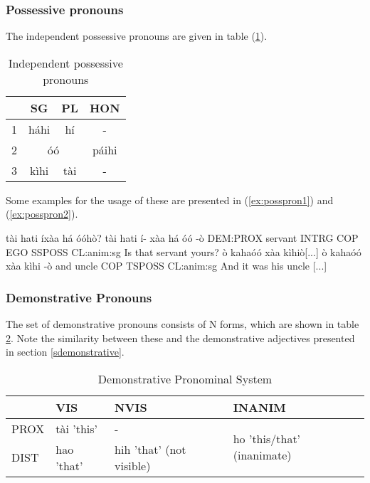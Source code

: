 \documentclass[a4paper, 12pt, oneside]{memoir}
\begin{document}
\subsubsection{Possessive pronouns}
The independent possessive pronouns are given in table (\ref{t:posspron}).
\begin{table}[H]
\begin{centering}
\begin{tabular}{@{}lccc@{}}
\toprule
\multicolumn{1}{c}{} & SG         & PL        & HON   \\ \midrule
1                    & háhi       & hí        & -     \\
2                    & \multicolumn{2}{c}{óó} & páihi \\
3                    & kìhi       & tài       & -     \\ \bottomrule
\end{tabular}
\caption{Independent possessive pronouns}
\label{t:posspron}
\end{centering}
\end{table}
Some examples for the usage of these are presented in (\ref{ex:posspron1}) and (\ref{ex:posspron2}).
\begin{examples}
\ex \label{ex:posspron1}
\words tài hati íxàa há óóhò?
\bits tài hati í- xàa há óó -ò
\gloss DEM:PROX servant INTRG COP EGO SSPOSS CL:anim:sg
\tr Is that servant yours?
\ex \label{ex:posspron2}
\words ò kahaóó xàa kìhiò[...]
\bits ò kahaóó xàa kìhi -ò
\gloss and uncle COP TSPOSS CL:anim:sg
\tr And it was his uncle [...]
\end{examples}
\subsubsection{Demonstrative Pronouns}
The set of demonstrative pronouns consists of N forms, which are shown in table \ref{t:dempron}. Note the similarity between these and the demonstrative adjectives presented in section \ref{sdemonstrative}.

\begin{table}[H]
\centering
\begin{tabular}{@{}llll@{}}
\toprule
     & VIS        & NVIS                     & INANIM                                      \\ \midrule
PROX & tài 'this' & -                        & \multirow{2}{*}{ho 'this/that' (inanimate)} \\
DIST & hao 'that' & hih 'that' (not visible) &                                           \\ \bottomrule
\end{tabular}
\caption{Demonstrative Pronominal System}
\label{t:dempron}
\end{table}
\end{document}
